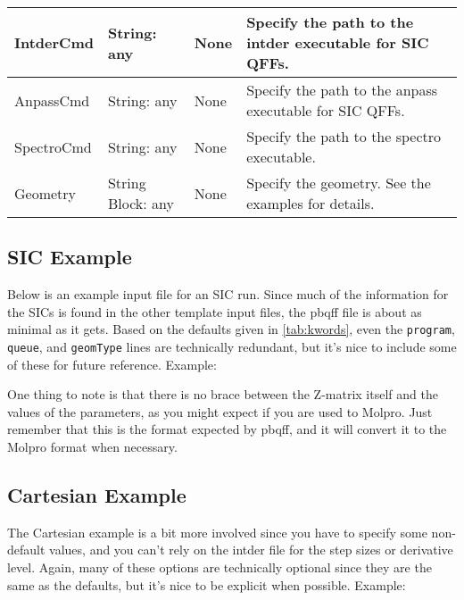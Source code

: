 \documentclass{article}
\begin{document}
\begin{table}[ht]
\begin{tabular}{|l|>{\raggedright}p{}|l|p{}|}
    \hline
    IntderCmd                     & String: any & None & Specify the path to the intder executable for SIC QFFs.\\
    \hline
    AnpassCmd                     & String: any & None & Specify the path to the anpass executable for SIC QFFs.\\
    \hline
    SpectroCmd                    & String: any & None & Specify the path to the spectro executable.\\
    \hline
    Geometry                      & String Block: any & None & Specify the geometry. See the examples for details.\\
    \hline
  \end{tabular}
\end{table}

\subsection{SIC Example}

Below is an example input file for an SIC run. Since much of the
information for the SICs is found in the other template input files,
the pbqff file is about as minimal as it gets. Based on the defaults
given in \autoref{tab:kwords}, even the \verb|program|,
\verb|queue|, and \verb|geomType| lines are technically redundant, but
it's nice to include some of these for future reference. Example:



One thing to note is that there is no brace between the Z-matrix
itself and the values of the parameters, as you might expect if you
are used to Molpro. Just remember that this is the format expected by
pbqff, and it will convert it to the Molpro format when necessary.

\subsection{Cartesian Example}

The Cartesian example is a bit more involved since you have to specify
some non-default values, and you can't rely on the intder file for the
step sizes or derivative level. Again, many of these options are
technically optional since they are the same as the defaults, but it's
nice to be explicit when possible. Example:


\end{document}
